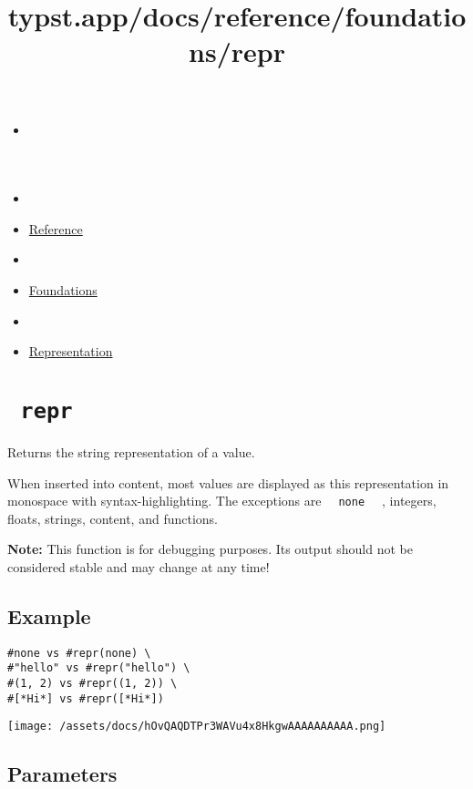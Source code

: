 \title{typst.app/docs/reference/foundations/repr}

\begin{itemize}
\tightlist
\item
  \href{/docs}{}
\item
  
\item
  \href{/docs/reference/}{Reference}
\item
  
\item
  \href{/docs/reference/foundations/}{Foundations}
\item
  
\item
  \href{/docs/reference/foundations/repr/}{Representation}
\end{itemize}

\section{\texorpdfstring{\texttt{\ repr\ }}{ repr }}\label{summary}

Returns the string representation of a value.

When inserted into content, most values are displayed as this
representation in monospace with syntax-highlighting. The exceptions are
\texttt{\ }{\texttt{\ none\ }}\texttt{\ } , integers, floats, strings,
content, and functions.

\textbf{Note:} This function is for debugging purposes. Its output
should not be considered stable and may change at any time!

\subsection{Example}\label{example}

\begin{verbatim}
#none vs #repr(none) \
#"hello" vs #repr("hello") \
#(1, 2) vs #repr((1, 2)) \
#[*Hi*] vs #repr([*Hi*])
\end{verbatim}

\texttt{[image: /assets/docs/hOvQAQDTPr3WAVu4x8HkgwAAAAAAAAAA.png]}

\subsection{\texorpdfstring{{ Parameters
}}{ Parameters }}\label{parameters}

